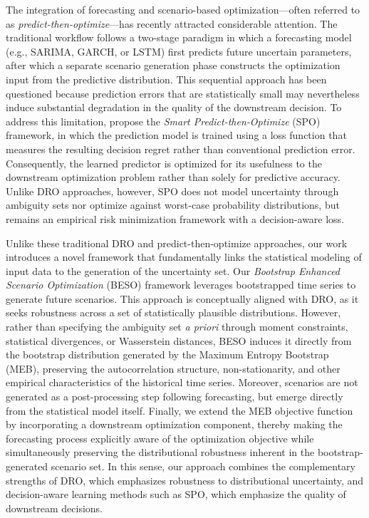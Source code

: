 \documentclass[11pt]{article}
\begin{document}
The integration of forecasting and scenario-based optimization---often referred to as {\it predict-then-optimize}---has recently attracted considerable attention. The traditional workflow follows a two-stage paradigm in which a forecasting model (e.g., SARIMA, GARCH, or LSTM) first predicts future uncertain parameters, after which a separate scenario generation phase constructs the optimization input from the predictive distribution. This sequential approach has been questioned because prediction errors that are statistically small may nevertheless induce substantial degradation in the quality of the downstream decision. To address this limitation, \citet{EG22} propose the {\it Smart Predict-then-Optimize} (SPO) framework, in which the prediction model is trained using a loss function that measures the resulting decision regret rather than conventional prediction error. Consequently, the learned predictor is optimized for its usefulness to the downstream optimization problem rather than solely for predictive accuracy. Unlike DRO approaches, however, SPO does not model uncertainty through ambiguity sets nor optimize against worst-case probability distributions, but remains an empirical risk minimization framework with a decision-aware loss.

Unlike these traditional DRO and predict-then-optimize approaches, our work introduces a novel framework that fundamentally links the statistical modeling of input data to the generation of the uncertainty set. Our {\it Bootstrap Enhanced Scenario Optimization} (BESO) framework leverages bootstrapped time series to generate future scenarios. This approach is conceptually aligned with DRO, as it seeks robustness across a set of statistically plausible distributions. However, rather than specifying the ambiguity set {\it a priori} through moment constraints, statistical divergences, or Wasserstein distances, BESO induces it directly from the bootstrap distribution generated by the Maximum Entropy Bootstrap (MEB), preserving the autocorrelation structure, non-stationarity, and other empirical characteristics of the historical time series. Moreover, scenarios are not generated as a post-processing step following forecasting, but emerge directly from the statistical model itself. Finally, we extend the MEB objective function by incorporating a downstream optimization component, thereby making the forecasting process explicitly aware of the optimization objective while simultaneously preserving the distributional robustness inherent in the bootstrap-generated scenario set. In this sense, our approach combines the complementary strengths of DRO, which emphasizes robustness to distributional uncertainty, and decision-aware learning methods such as SPO, which emphasize the quality of downstream decisions.
\end{document}
